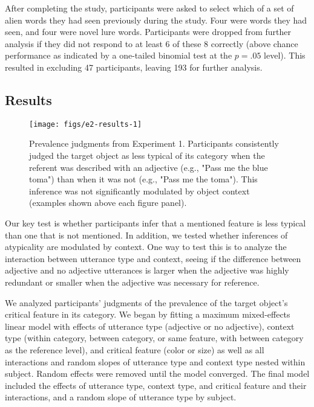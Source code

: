 \documentclass{ucetd}
\begin{document}
After completing the study, participants were asked to select which of a
set of alien words they had seen previously during the study. Four were
words they had seen, and four were novel lure words. Participants were
dropped from further analysis if they did not respond to at least 6 of
these 8 correctly (above chance performance as indicated by a one-tailed
binomial test at the \(p = .05\) level). This resulted in excluding 47
participants, leaving 193 for further analysis.

\hypertarget{results-2}{%
\subsection{Results}\label{results-2}}

\begin{figure}[!tb]

{\centering \texttt{[image: figs/e2-results-1]} 

}

\caption{Prevalence judgments from Experiment 1. Participants consistently judged the target object as less typical of its category when the referent was described with an adjective (e.g., "Pass me the blue toma") than when it was not (e.g., "Pass me the toma"). This inference was not significantly modulated by object context (examples shown above each figure panel).}\label{fig:e2-results}
\end{figure}

Our key test is whether participants infer that a mentioned feature is
less typical than one that is not mentioned. In addition, we tested
whether inferences of atypicality are modulated by context. One way to
test this is to analyze the interaction between utterance type and
context, seeing if the difference between adjective and no adjective
utterances is larger when the adjective was highly redundant or smaller
when the adjective was necessary for reference.

We analyzed participants' judgments of the prevalence of the target
object's critical feature in its category. We began by fitting a maximum
mixed-effects linear model with effects of utterance type (adjective or
no adjective), context type (within category, between category, or same
feature, with between category as the reference level), and critical
feature (color or size) as well as all interactions and random slopes of
utterance type and context type nested within subject. Random effects
were removed until the model converged. The final model included the
effects of utterance type, context type, and critical feature and their
interactions, and a random slope of utterance type by subject.
\end{document}
